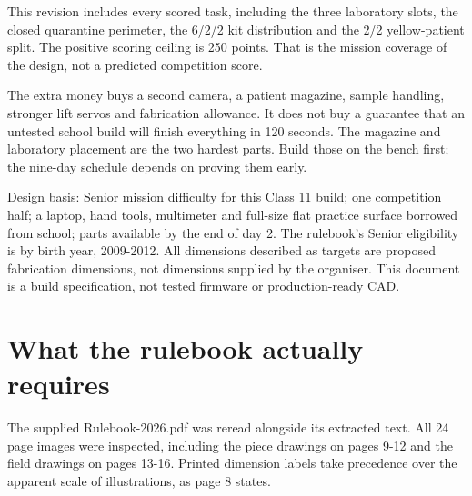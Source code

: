 \documentclass[10pt,a4paper]{article}
\begin{document}
This revision includes every scored task, including the three laboratory slots, the closed quarantine perimeter, the 6/2/2 kit distribution and the 2/2 yellow-patient split. The positive scoring ceiling is 250 points. That is the mission coverage of the design, not a predicted competition score.

The extra money buys a second camera, a patient magazine, sample handling, stronger lift servos and fabrication allowance. It does not buy a guarantee that an untested school build will finish everything in 120 seconds. The magazine and laboratory placement are the two hardest parts. Build those on the bench first; the nine-day schedule depends on proving them early.

Design basis: Senior mission difficulty for this Class 11 build; one competition half; a laptop, hand tools, multimeter and full-size flat practice surface borrowed from school; parts available by the end of day 2. The rulebook's Senior eligibility is by birth year, 2009-2012. All dimensions described as targets are proposed fabrication dimensions, not dimensions supplied by the organiser. This document is a build specification, not tested firmware or production-ready CAD.

\section{What the rulebook actually requires}
The supplied Rulebook-2026.pdf was reread alongside its extracted text. All 24 page images were inspected, including the piece drawings on pages 9-12 and the field drawings on pages 13-16. Printed dimension labels take precedence over the apparent scale of illustrations, as page 8 states.
\end{document}
